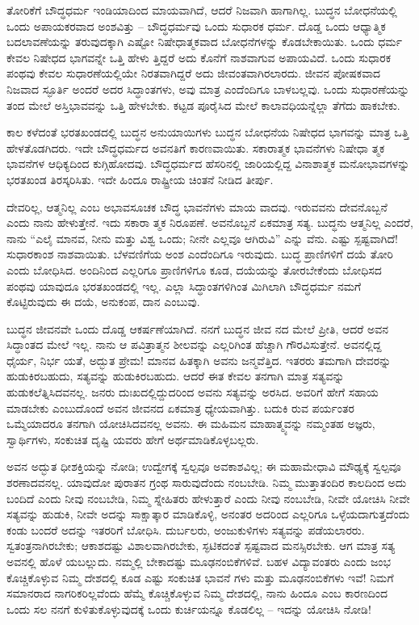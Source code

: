 ತೋರಿಕೆಗೆ ಬೌದ್ಧಧರ್ಮ ಇಂಡಿಯಾದಿಂದ ಮಾಯವಾಗಿದೆ, ಆದರೆ ನಿಜವಾಗಿ ಹಾಗಾಗಿಲ್ಲ. ಬುದ್ಧನ ಬೋಧನೆಯಲ್ಲಿ ಒಂದು ಅಪಾಯಕರವಾದ ಅಂಶವಿತ್ತು – ಬೌದ್ಧಧರ್ಮವು ಒಂದು ಸುಧಾರಕ ಧರ್ಮ. ದೊಡ್ಡ ಒಂದು ಆಧ್ಯಾತ್ಮಿಕ ಬದಲಾವಣೆಯನ್ನು ತರುವುದಕ್ಕಾಗಿ ಎಷ್ಟೋ ನಿಷೇಧಾತ್ಮಕವಾದ ಬೋಧನೆಗಳನ್ನು ಕೊಡಬೇಕಾಯಿತು. ಒಂದು ಧರ್ಮ ಕೇವಲ ನಿಷೇಧದ ಭಾಗವನ್ನೇ ಒತ್ತಿ ಹೇಳು ತ್ತಿದ್ದರೆ ಅದು ಕೊನೆಗೆ ನಾಶವಾಗುವ ಅಪಾಯವಿದೆ. ಒಂದು ಸುಧಾರಕ ಪಂಥವು ಕೇವಲ ಸುಧಾರಣೆಯಲ್ಲಿಯೇ ನಿರತವಾಗಿದ್ದರೆ ಅದು ಜೀವಂತವಾಗಿರಲಾರದು. ಜೀವನ ಪೋಷಕವಾದ ನಿಜವಾದ ಸ್ಫೂರ್ತಿ ಅಂದರೆ ಅದರ ಸಿದ್ಧಾಂತಗಳು, ಅವು ಮಾತ್ರ ಎಂದೆಂದಿಗೂ ಬಾಳಬಲ್ಲವು. ಒಂದು ಸುಧಾರಣೆಯನ್ನು ತಂದ ಮೇಲೆ ಅಸ್ತಿಭಾವವನ್ನು ಒತ್ತಿ ಹೇಳಬೇಕು. ಕಟ್ಟಡ ಪೂರೈಸಿದ ಮೇಲೆ ಕಾಲಾವಧಿಯನ್ನೆಲ್ಲಾ ತೆಗೆದು ಹಾಕಬೇಕು.

ಕಾಲ ಕಳೆದಂತೆ ಭರತಖಂಡದಲ್ಲಿ ಬುದ್ಧನ ಅನುಯಾಯಿಗಳು ಬುದ್ಧನ ಬೋಧನೆಯ ನಿಷೇಧದ ಭಾಗವನ್ನು ಮಾತ್ರ ಒತ್ತಿ ಹೇಳತೊಡಗಿದರು. ಇದೇ ಬೌದ್ಧಧರ್ಮದ ಅವನತಿಗೆ ಕಾರಣವಾಯಿತು. ಸಕಾರಾತ್ಮಕ ಭಾವನೆಗಳು ನಿಷೇಧಾ ತ್ಮಕ ಭಾವನೆಗಳ ಆಧಿಕ್ಯದಿಂದ ಕುಗ್ಗಿಹೋದವು. ಬೌದ್ಧಧರ್ಮದ ಹೆಸರಿನಲ್ಲಿ ಜಾರಿಯಲ್ಲಿದ್ದ ವಿನಾಶಾತ್ಮಕ ಮನೋಭಾವಗಳನ್ನು ಭರತಖಂಡ ತಿರಸ್ಕರಿಸಿತು. ಇದೇ ಹಿಂದೂ ರಾಷ್ಟ್ರೀಯ ಚಿಂತನೆ ನೀಡಿದ ತೀರ್ಪು.

ದೇವರಿಲ್ಲ, ಆತ್ಮನಿಲ್ಲ ಎಂಬ ಅಭಾವಸೂಚಕ ಬೌದ್ಧ ಭಾವನೆಗಳು ಮಾಯ ವಾದವು. ಇರುವವನು ದೇವನೊಬ್ಬನೆ ಎಂದು ನಾನು ಹೇಳುತ್ತೇನೆ. ಇದು ಸಕಾರಾ ತ್ಮಕ ನಿರೂಪಣೆ. ಅವನೊಬ್ಬನೆ ಏಕಮಾತ್ರ ಸತ್ಯ. ಬುದ್ಧನು ಆತ್ಮನಿಲ್ಲ ಎಂದರೆ, ನಾನು “ಎಲೈ ಮಾನವ, ನೀನು ಮತ್ತು ವಿಶ್ವ ಒಂದು; ನೀನೇ ಎಲ್ಲವೂ ಆಗಿರುವಿ” ಎನ್ನು ವೆನು. ಎಷ್ಟು ಸ್ಪಷ್ಟವಾಗಿದೆ! ಸುಧಾರಕಾಂಶ ನಾಶವಾಯಿತು. ಬೆಳವಣಿಗೆಯ ಅಂಶ ಎಂದೆಂದಿಗೂ ಇರುವುದು. ಬುದ್ಧ ಪ್ರಾಣಿಗಳಿಗೆ ದಯೆ ತೋರಿ ಎಂದು ಬೋಧಿಸಿದ. ಅಂದಿನಿಂದ ಎಲ್ಲರಿಗೂ ಪ್ರಾಣಿಗಳಿಗೂ ಕೂಡ, ದಯೆಯನ್ನು ತೋರಬೇಕೆಂದು ಬೋಧಿಸದ ಪಂಥವು ಯಾವುದೂ ಭರತಖಂಡದಲ್ಲಿ ಇಲ್ಲ. ಎಲ್ಲಾ ಸಿದ್ಧಾಂತಗಳಿಗಿಂತ ಮಿಗಿಲಾಗಿ ಬೌದ್ಧಧರ್ಮ ನಮಗೆ ಕೊಟ್ಟಿರುವುದು ಈ ದಯೆ, ಅನುಕಂಪ, ದಾನ ಎಂಬುವು.

ಬುದ್ಧನ ಜೀವನವೇ ಒಂದು ದೊಡ್ಡ ಆಕರ್ಷಣೆಯಾಗಿದೆ. ನನಗೆ ಬುದ್ಧನ ಜೀವ ನದ ಮೇಲೆ ಪ್ರೀತಿ, ಆದರೆ ಅವನ ಸಿದ್ಧಾಂತದ ಮೇಲೆ ಇಲ್ಲ. ನಾನು ಆ ಪವಿತ್ರಾತ್ಮನ ಶೀಲವನ್ನು ಎಲ್ಲರಿಗಿಂತ ಹೆಚ್ಚಾಗಿ ಗೌರವಿಸುತ್ತೇನೆ. ಅವನಲ್ಲಿದ್ದ ಧೈರ್ಯ, ನಿರ್ಭ ಯತೆ, ಅದ್ಭುತ ಪ್ರೇಮ! ಮಾನವ ಹಿತಕ್ಕಾಗಿ ಅವನು ಜನ್ಮವೆತ್ತಿದ. ಇತರರು ತಮಗಾಗಿ ದೇವರನ್ನು ಹುಡುಕಿರಬಹುದು, ಸತ್ಯವನ್ನು ಹುಡುಕಿರಬಹುದು. ಆದರೆ ಈತ ಕೇವಲ ತನಗಾಗಿ ಮಾತ್ರ ಸತ್ಯವನ್ನು ಹುಡುಕಲೆತ್ನಿಸಿದವನಲ್ಲ. ಜನರು ದುಃಖದಲ್ಲಿದ್ದುದರಿಂದ ಅವನು ಸತ್ಯವನ್ನು ಅರಸಿದ. ಅವರಿಗೆ ಹೇಗೆ ಸಹಾಯ ಮಾಡಬೇಕು ಎಂಬುದೊಂದೆ ಅವನ ಜೀವನದ ಏಕಮಾತ್ರ ಧ್ಯೇಯವಾಗಿತ್ತು. ಬದುಕಿ ರುವ ಪರ್ಯಂತರ ಒಮ್ಮೆಯಾದರೂ ತನಗಾಗಿ ಯೋಚಿಸಿದವನಲ್ಲ ಅವನು. ಈ ಮಹಿಮನ ಮಾಹಾತ್ಮ್ಯವನ್ನು ನಮ್ಮಂತಹ ಅಜ್ಞರು, ಸ್ವಾರ್ಥಿಗಳು, ಸಂಕುಚಿತ ದೃಷ್ಟಿ ಯವರು ಹೇಗೆ ಅರ್ಥಮಾಡಿಕೊಳ್ಳಬಲ್ಲರು.

ಅವನ ಅದ್ಭುತ ಧೀಶಕ್ತಿಯನ್ನು ನೋಡಿ; ಉದ್ವೇಗಕ್ಕೆ ಸ್ವಲ್ಪವೂ ಅವಕಾಶವಿಲ್ಲ; ಈ ಮಹಾಮೇಧಾವಿ ಮೌಢ್ಯಕ್ಕೆ ಸ್ವಲ್ಪವೂ ಶರಣಾದವನಲ್ಲ. ಯಾವುದೋ ಪುರಾತನ ಗ್ರಂಥ ಸಾರುವುದೆಂದು ನಂಬಬೇಡಿ. ನಿಮ್ಮ ಮುತ್ತಾತಂದಿರ ಕಾಲದಿಂದ ಅದು ಬಂದಿದೆ ಎಂದು ನೀವು ನಂಬಬೇಡಿ, ನಿಮ್ಮ ಸ್ನೇಹಿತರು ಹೇಳುತ್ತಾರೆ ಎಂದು ನೀವು ನಂಬಬೇಡಿ, ನೀವೇ ಯೋಚಿಸಿ ನೀವೇ ಸತ್ಯವನ್ನು ಹುಡುಕಿ, ನೀವೇ ಅದನ್ನು ಸಾಕ್ಷಾತ್ಕಾರ ಮಾಡಿಕೊಳ್ಳಿ, ಅನಂತರ ಅದರಿಂದ ಎಲ್ಲರಿಗೂ ಒಳ್ಳೆಯದಾಗುತ್ತದೆಂದು ಕಂಡು ಬಂದರೆ ಅದನ್ನು ಇತರರಿಗೆ ಬೋಧಿಸಿ. ದುರ್ಬಲರು, ಅಂಜುಕುಳಿಗಳು ಸತ್ಯವನ್ನು ಪಡೆಯಲಾರರು. ಸ್ವತಂತ್ರನಾಗಿರಬೇಕು; ಆಕಾಶದಷ್ಟು ವಿಶಾಲವಾಗಿರಬೇಕು, ಸ್ಫಟಿಕದಂತೆ ಸ್ಪಷ್ಟವಾದ ಮನಸ್ಸಿರಬೇಕು. ಆಗ ಮಾತ್ರ ಸತ್ಯ ಅವನಲ್ಲಿ ಹೊಳೆ ಯಬಲ್ಲುದು. ನಮ್ಮಲ್ಲಿ ಬೇಕಾದಷ್ಟು ಮೂಢನಂಬಿಕೆಗಳಿವೆ. ಬಹಳ ವಿದ್ಯಾವಂತರು ಎಂದು ಜಂಭ ಕೊಚ್ಚಿಕೊಳ್ಳುವ ನಿಮ್ಮ ದೇಶದಲ್ಲಿ ಕೂಡ ಎಷ್ಟು ಸಂಕುಚಿತ ಭಾವನೆ ಗಳು ಮತ್ತು ಮೂಢನಂಬಿಕೆಗಳು ಇವೆ! ನಿಮಗೆ ಸಮಾನರಾದ ನಾಗರಿಕರಿಲ್ಲವೆಂದು ಹೆಮ್ಮೆ ಕೊಚ್ಚಿಕೊಳ್ಳುವ ನಿಮ್ಮ ದೇಶದಲ್ಲಿ, ನಾನು ಹಿಂದೂ ಎಂಬ ಕಾರಣದಿಂದ ಒಂದು ಸಲ ನನಗೆ ಕುಳಿತುಕೊಳ್ಳುವುದಕ್ಕೆ ಒಂದು ಕುರ್ಚಿಯನ್ನೂ ಕೊಡಲಿಲ್ಲ – ಇದನ್ನು ಯೋಚಿಸಿ ನೋಡಿ!

